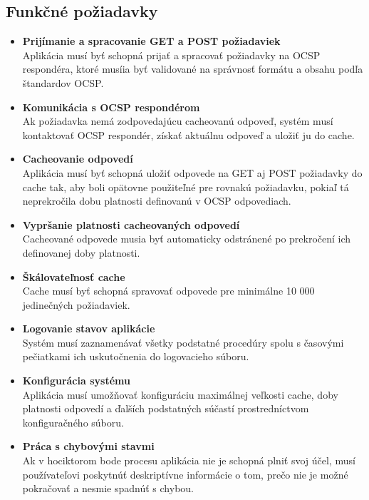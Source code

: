 \documentclass[12pt, twoside]{book}
\begin{document}
\subsection{Funkčné požiadavky}

\begin{itemize}
\item \textbf{Prijímanie a spracovanie  GET a POST požiadaviek} \\
Aplikácia  musí byť schopná prijať a spracovať požiadavky na OCSP respondéra, ktoré musíia byť validované na správnosť formátu a obsahu podľa štandardov OCSP. 

\item \textbf{Komunikácia s OCSP respondérom} \\
Ak požiadavka nemá zodpovedajúcu cacheovanú odpoveď, systém musí kontaktovať OCSP respondér, získať aktuálnu odpoveď a uložiť ju do cache.

\item \textbf{Cacheovanie odpovedí} \\
Aplikácia musí byť schopná uložiť odpovede na GET aj POST požiadavky do cache tak, aby boli opätovne použiteľné pre rovnakú požiadavku, pokiaľ tá neprekročila dobu platnosti definovanú v OCSP odpovediach.

\item \textbf{Vypršanie platnosti cacheovaných odpovedí} \\
Cacheované odpovede musia byť automaticky odstránené po prekročení ich definovanej doby platnosti.

\item \textbf{Škálovateľnosť cache} \\
Cache musí byť schopná spravovať odpovede pre minimálne 10 000 jedinečných požiadaviek.

\item \textbf{Logovanie stavov aplikácie} \\
Systém musí zaznamenávať všetky podstatné procedúry spolu s časovými pečiatkami ich uskutočnenia do logovacieho súboru.

\item \textbf{Konfigurácia systému} \\
Aplikácia musí umožňovať konfiguráciu maximálnej veľkosti cache, doby platnosti odpovedí a ďalších podstatných súčastí prostredníctvom konfiguračného súboru.

\item \textbf{Práca s chybovými stavmi} \\
Ak v hociktorom bode procesu aplikácia nie je schopná plniť svoj účel, musí používateľovi poskytnúť deskriptívne informácie o tom, prečo nie je možné pokračovať a nesmie spadnúť s chybou.
\end{itemize}
\end{document}
